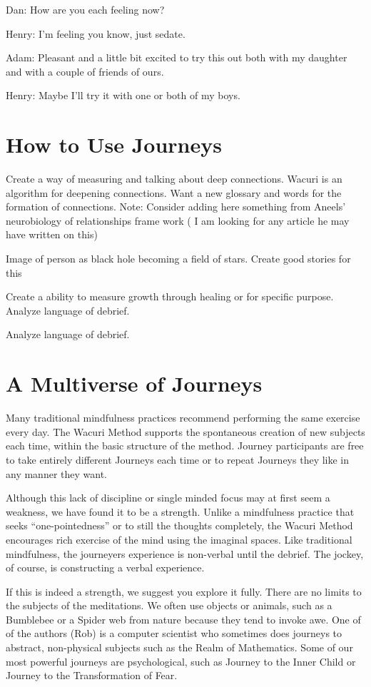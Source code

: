 \documentclass[12pt]{book}
\begin{document}
Dan: How are you each feeling now?

Henry: I'm feeling you know, just sedate.

Adam: Pleasant and a little bit excited to try this out both with my daughter and with a couple of friends of ours.

Henry: Maybe I'll try it with one or both of my boys.




\chapter{How to Use Journeys}


Create a way of measuring and talking about deep connections. Wacuri is an algorithm for deepening connections. Want a new glossary and words for the formation of connections. Note: Consider adding here something from Aneels' neurobiology of relationships frame work ( I am looking for any article he may have written on this)

Image of person as black hole becoming a field of stars. Create good stories for this

Create a ability to measure growth through healing or for specific purpose. Analyze language of debrief.


Analyze language of debrief.

\chapter{ A Multiverse of Journeys}

Many traditional mindfulness practices recommend performing the same exercise every day. The Wacuri Method supports the spontaneous creation of new subjects each time, within the basic structure of the method. Journey participants are free to take entirely different Journeys each time or to repeat Journeys they like in any manner they want.
					
Although this lack of discipline or single minded focus may at first seem a weakness, we have found it to be a strength. Unlike a mindfulness practice that seeks “one-pointedness” or to still the thoughts completely, the Wacuri Method encourages rich exercise of the mind using the imaginal spaces. Like traditional mindfulness, the journeyers experience is non-verbal until the debrief. The jockey, of course, is constructing a verbal experience.
					
If this is indeed a strength, we suggest you explore it fully. There are no limits to the subjects of the meditations. We often use objects or animals, such as a Bumblebee or a Spider web from nature because they tend to invoke awe. One of of the authors (Rob) is a computer scientist who sometimes does journeys to abstract, non-physical subjects such as the Realm of Mathematics. Some of our most powerful journeys are psychological, such as Journey to the Inner Child or Journey to the Transformation of Fear.
					
\end{document}
